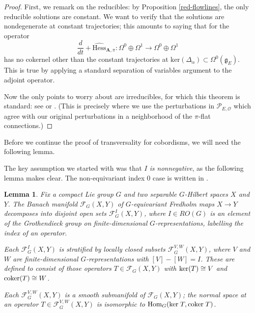 \documentclass{memo-l}
\newtheorem{lemma}[theorem]{Lemma}
\theoremstyle{definition}
\theoremstyle{remark}
\numberwithin{section}{chapter}
\numberwithin{equation}{chapter}
\begin{document}
\begin{proof}First, we remark on the reducibles: by Proposition \ref{red-flowlines}, the only reducible solutions are constant. We want to verify that the solutions are nondegenerate at constant trajectories; this amounts to saying that for the operator $$\frac{d}{dt} + \widehat{\text{Hess}}_{\mathbf{A},\pi}: \Omega^0 \oplus \Omega^1 \to \Omega^0 \oplus \Omega^1$$ has no cokernel other than the constant trajectories at $\text{ker}(\Delta_\alpha) \subset \Omega^0(\mathfrak g_E)$. This is true by applying a standard separation of variables argument to the adjoint operator.

Now the only points to worry about are irreducibles, for which this theorem is standard: see \cite[Section~5.5.1]{Don} or \cite{KM1}. (This is precisely where we use the perturbations in $\mathcal P_{E, \mathcal O}$ which agree with our original perturbations in a neighborhood of the $\pi$-flat connections.)
\end{proof}

Before we continue the proof of transversality for cobordisms, we will need the following lemma.

The key assumption we started with was that \emph{$I$ is nonnegative}, as the following lemma makes clear. The non-equivariant index $0$ case is written in \cite[Appendix~A.3]{Salamon}.

\begin{lemma}\label{CokernelManifold}Fix a compact Lie group $G$ and two separable $G$-Hilbert spaces $X$ and $Y$. The Banach manifold $\mathcal F_G(X, Y)$ of $G$-equivariant Fredholm maps $X \to Y$ decomposes into disjoint open sets $\mathcal F_G^I(X, Y)$, where $I \in RO(G)$ is an element of the Grothendieck group on finite-dimensional $G$-representations, labelling the index of an operator.

Each $\mathcal F^I_G(X, Y)$ is stratified by locally closed subsets $\mathcal F^{V,W}_G(X, Y)$, where $V$ and $W$ are finite-dimensional $G$-representations with $[V] - [W] = I$. These are defined to consist of those operators $T \in \mathcal F_G(X, Y)$ with $\textup{ker}(T) \cong V$ and $\textup{coker}(T) \cong W$.

Each $\mathcal F^{V, W}_G(X, Y)$ is a smooth submanifold of $\mathcal F_G(X,Y)$; the normal space at an operator $T \in \mathcal F^{V, W}_G(X, Y)$ is isomorphic to $\textup{Hom}_G(\textup{ker} \;T, \textup{coker} \;T)$.
\end{lemma}
\end{document}

